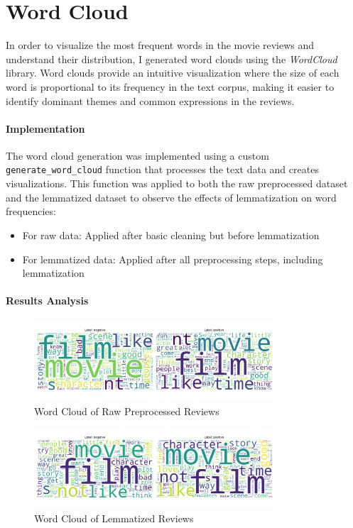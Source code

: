 \documentclass[12pt]{article}
\begin{document}
\section{Word Cloud}
In order to visualize the most frequent words in the movie reviews and understand their distribution, I generated word clouds using the \textit{WordCloud} library. Word clouds provide an intuitive visualization where the size of each word is proportional to its frequency in the text corpus, making it easier to identify dominant themes and common expressions in the reviews.

\paragraph{Implementation}
The word cloud generation was implemented using a custom \texttt{generate\_word\_cloud} function that processes the text data and creates visualizations. This function was applied to both the raw preprocessed dataset and the lemmatized dataset to observe the effects of lemmatization on word frequencies:

\begin{itemize}
    \item For raw data: Applied after basic cleaning but before lemmatization
    \item For lemmatized data: Applied after all preprocessing steps, including lemmatization
\end{itemize}

\paragraph{Results Analysis}
\begin{figure}[h]
    \centering
    \includegraphics[width=0.8\textwidth]{raw_wordcloud.png}
    \caption{Word Cloud of Raw Preprocessed Reviews}
    \label{fig:raw_wordcloud}
\end{figure}

\begin{figure}[h]
    \centering
    \includegraphics[width=0.8\textwidth]{lemma_wordcloud.png}
    \caption{Word Cloud of Lemmatized Reviews}
    \label{fig:lemma_wordcloud}
\end{figure}
\end{document}
